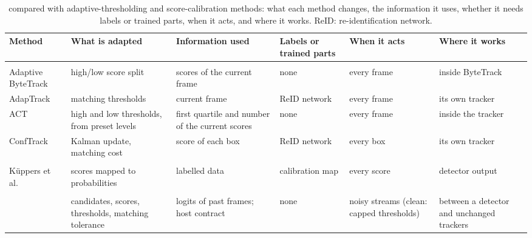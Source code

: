 \begin{table}[!tp]
\caption{\scl{} compared with adaptive-thresholding and score-calibration methods: what each method
changes, the information it uses, whether it needs labels or trained parts, when it acts, and where
it works. ReID: re-identification network.}
\label{tab:compare}
\centering\footnotesize
\setlength{\tabcolsep}{2.5pt}
\begin{tabular}{@{}>{\raggedright\arraybackslash}p{26mm}>{\raggedright\arraybackslash}p{33mm}>{\raggedright\arraybackslash}p{32mm}>{\raggedright\arraybackslash}p{17mm}>{\raggedright\arraybackslash}p{19mm}>{\raggedright\arraybackslash}p{24mm}@{}}
\toprule
Method & What is adapted & Information used & Labels or trained parts & When it acts & Where it works\\
\midrule
\multicolumn{6}{@{}l}{\textit{Adaptive thresholding}}\\
Adaptive ByteTrack \cite{ma2023adaptivebytetrack} & high/low score split & scores of the current frame & none & every frame & inside ByteTrack\\
AdapTrack \cite{shim2024adaptrack} & matching thresholds & current frame & ReID network & every frame & its own tracker\\
ACT \cite{act2026adaptive} & high and low thresholds, from preset levels & first quartile and number of the current scores & none & every frame & inside the tracker\\
ConfTrack \cite{jung2024conftrack} & Kalman update, matching cost & score of each box & ReID network & every box & its own tracker\\
\addlinespace[2pt]
\multicolumn{6}{@{}l}{\textit{Score calibration}}\\
K{\"u}ppers et al.\ \cite{kuppers2020detcalib} & scores mapped to probabilities & labelled data & calibration map & every score & detector output\\
\addlinespace[2pt]
\multicolumn{6}{@{}l}{\textit{This paper}}\\
\scl{} & candidates, scores, thresholds, matching tolerance & logits of past frames; host contract & none & noisy streams (clean: capped thresholds) & between a detector and unchanged trackers\\
\bottomrule
\end{tabular}
\end{table}
